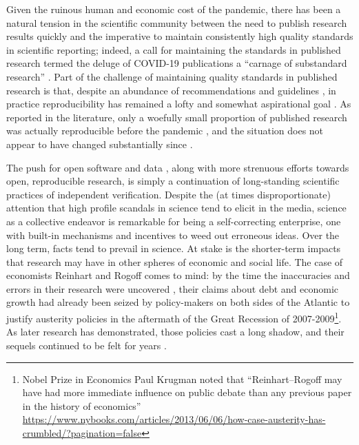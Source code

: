\documentclass[preprint, 3p,
authoryear]{elsarticle} %
\begin{document}
Given the ruinous human and economic cost of the pandemic, there has
been a natural tension in the scientific community between the need to
publish research results quickly and the imperative to maintain
consistently high quality standards in scientific reporting; indeed, a
call for maintaining the standards in published research termed the
deluge of COVID-19 publications a ``carnage of substandard research''
\citep{Bramstedt2020carnage}. Part of the challenge of maintaining
quality standards in published research is that, despite an abundance of
recommendations and guidelines
\citep[e.g.,][]{Broggini2017reproducible, Ince2012case, Ioannidis2014increasing, Brunsdon2020opening},
in practice reproducibility has remained a lofty and somewhat
aspirational goal
\citep{Konkol2019examination, Konkol2019computational}. As reported in
the literature, only a woefully small proportion of published research
was actually reproducible before the pandemic
\citep{Iqbal2016reproducible, Stodden2018empirical}, and the situation
does not appear to have changed substantially since
\citep{Sumner2020reproducibility, Gustot2020quality}.

The push for open software and data
\citep[e.g.,][]{Bivand2020progress, Arribas2021open}, along with more
strenuous efforts towards open, reproducible research, is simply a
continuation of long-standing scientific practices of independent
verification. Despite the (at times disproportionate) attention that
high profile scandals in science tend to elicit in the media, science as
a collective endeavor is remarkable for being a self-correcting
enterprise, one with built-in mechanisms and incentives to weed out
erroneous ideas. Over the long term, facts tend to prevail in science.
At stake is the shorter-term impacts that research may have in other
spheres of economic and social life. The case of economists Reinhart and
Rogoff comes to mind: by the time the inaccuracies and errors in their
research were uncovered \citep[see][]{Herndon2014high}, their claims
about debt and economic growth had already been seized by policy-makers
on both sides of the Atlantic to justify austerity policies in the
aftermath of the Great Recession of 2007-2009\footnote{Nobel Prize in
  Economics Paul Krugman noted that ``Reinhart--Rogoff may have had more
  immediate influence on public debate than any previous paper in the
  history of economics''
  \url{https://www.nybooks.com/articles/2013/06/06/how-case-austerity-has-crumbled/?pagination=false}}.
As later research has demonstrated, those policies cast a long shadow,
and their sequels continued to be felt for years \citep{Basu2017ten}.
\end{document}
